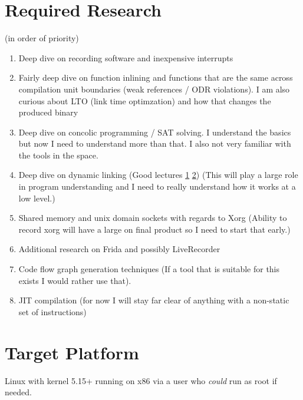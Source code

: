 \section{Required Research}
(in order of priority)
\begin{enumerate}
    \item Deep dive on recording software and inexpensive interrupts
    \item Fairly deep dive on function inlining and functions that are the same across compilation unit boundaries (weak references / ODR violations). I am also curious about LTO (link time optimzation) and how that changes the produced binary
    \item Deep dive on concolic programming / SAT solving. I understand the basics but now I need to understand more than that. I also not very familiar with the tools in the space. 
    \item Deep dive on dynamic linking (Good lectures \href{https://www.youtube.com/watch?v=dOfucXtyEsU}{1}  \href{https://www.youtube.com/watch?v=8nyq8SNUTSc}{2}) (This will play a large role in program understanding and I need to really understand how it works at a low level.)
    \item Shared memory and unix domain sockets with regards to Xorg (Ability to record xorg will have a large on final product so I need to start that early.)
    \item Additional research on Frida and possibly LiveRecorder
    \item Code flow graph generation techniques (If a tool that is suitable for this exists I would rather use that).
    \item JIT compilation (for now I will stay far clear of anything with a non-static set of instructions)

\end{enumerate}


\section{Target Platform}
Linux with kernel 5.15+ running on x86 via a user who \textit{could} run as root if needed. 



